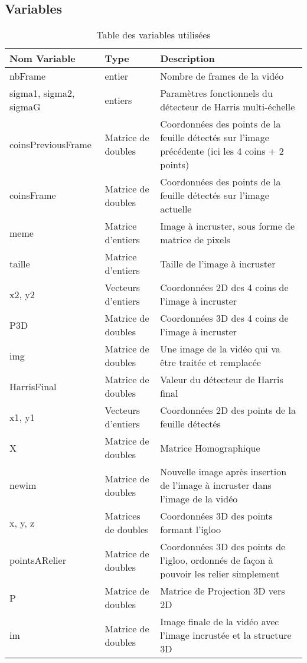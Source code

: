 \documentclass[blue]{ceri/sty/rapport}
\begin{document}
\subsection{Variables}
\label{sec:OptionsClasse5}


\begin{table}[H]
\caption{Table des variables utilisées}
\centering
{}
\begin{tabular}{m{5cm} m{4cm} m{6cm}}
\hline
\rowcolor{fgLightRed}
\textbf{Nom Variable} & \textbf{Type} & \textbf{Description} \\
\hline

nbFrame & entier & Nombre de frames de la vidéo \\
sigma1, sigma2, sigmaG & entiers & Paramètres fonctionnels du détecteur de Harris multi-échelle \\
coinsPreviousFrame & Matrice de doubles & Coordonnées des points de la feuille détectés sur l'image précédente (ici les 4 coins + 2 points) \\
coinsFrame & Matrice de doubles & Coordonnées des points de la feuille détectés sur l'image actuelle \\
meme & Matrice d'entiers & Image à incruster, sous forme de matrice de pixels \\
taille & Matrice d'entiers & Taille de l'image à incruster \\
x2, y2 & Vecteurs d'entiers & Coordonnées 2D des 4 coins de l'image à incruster \\
P3D & Matrice de doubles & Coordonnées 3D des 4 coins de l'image à incruster \\
img & Matrice de doubles & Une image de la vidéo qui va être traitée et remplacée \\
HarrisFinal & Matrice de doubles & Valeur du détecteur de Harris final \\
x1, y1 & Vecteurs d'entiers & Coordonnées 2D des points de la feuille détectés \\
X & Matrice de doubles & Matrice Homographique \\
newim & Matrice de doubles & Nouvelle image après insertion de l'image à incruster dans l'image de la vidéo  \\
x, y, z & Matrices de doubles & Coordonnées 3D des points formant l'igloo \\
pointsARelier & Matrice de doubles & Coordonnées 3D des points de l'igloo, ordonnés de façon à pouvoir les relier simplement \\
P & Matrice de doubles & Matrice de Projection 3D vers 2D \\
im & Matrice de doubles & Image finale de la vidéo avec l'image incrustée et la structure 3D \\



\hline
\end{tabular}
\label{tab:exemple3}
\end{table}
\end{document}

